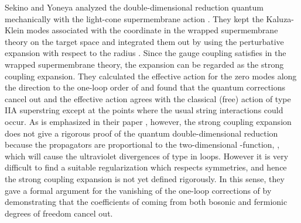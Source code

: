 \documentclass[a4paper,12pt]{article}
\begin{document}
Sekino and Yoneya analyzed the double-dimensional reduction quantum
mechanically with the light-cone supermembrane action \cite{SY}.
They kept the Kaluza-Klein modes associated with the \myHighlight{$\rho$}\coordHE{} coordinate
in the wrapped supermembrane theory on the target space \coordHE{} and integrated them out by using the perturbative expansion with
respect to the radius \coordHE{}.
Since the gauge coupling satisfies \coordHE{} in the wrapped
supermembrane theory, the expansion can be regarded as the strong
coupling expansion.
They calculated the effective action for the zero modes along the
\myHighlight{$\rho$}\coordHE{} direction to the one-loop order of \coordHE{}  and found
that the quantum corrections cancel out and the effective action
agrees with the classical (free) action of type IIA superstring except
at the points where the usual string interactions could occur.
As is emphasized in their paper \cite{SY}, however, the strong
coupling expansion does not give a rigorous proof of the quantum
double-dimensional reduction because the propagators are proportional
to the two-dimensional \myHighlight{$\delta$}\coordHE{}-function, \coordHE{}, which will cause the ultraviolet
divergences of \coordHE{} type in loops.
However it is very difficult to find a suitable regularization which
respects symmetries, and hence the strong coupling expansion is not
yet defined rigorously.
In this sense, they gave a formal argument for the vanishing of the
one-loop corrections of \coordHE{} by demonstrating that the
coefficients of \coordHE{} coming from both bosonic and
fermionic degrees of freedom cancel out.
\end{document}
